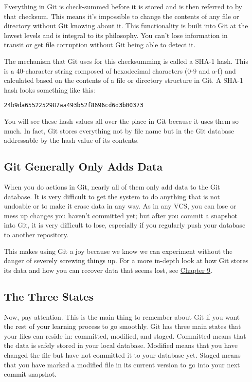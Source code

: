 \documentclass[a4paper]{book}
\newcounter{tab}[chapter]
\newcommand{\prechap}{Chapter }
\newcommand{\postchap}{}
\newcommand{\chapref}[1]{\hyperref[chap:#1]{\prechap #1\postchap}}
\begin{document}
Everything in Git is check-summed before it is stored and is then referred to by that checksum. This means it's impossible to change the contents of any file or directory without Git knowing about it. This functionality is built into Git at the lowest levels and is integral to its philosophy. You can't lose information in transit or get file corruption without Git being able to detect it.

The mechanism that Git uses for this checksumming is called a SHA-1 hash. This is a 40-character string composed of hexadecimal characters (0-9 and a-f) and calculated based on the contents of a file or directory structure in Git. A SHA-1 hash looks something like this:

\begin{shaded}\begin{verbatim}
24b9da6552252987aa493b52f8696cd6d3b00373
\end{verbatim}\end{shaded}

You will see these hash values all over the place in Git because it uses them so much. In fact, Git stores everything not by file name but in the Git database addressable by the hash value of its contents.

\subsection{Git Generally Only Adds Data}\label{git-generally-only-adds-data}

When you do actions in Git, nearly all of them only add data to the Git database. It is very difficult to get the system to do anything that is not undoable or to make it erase data in any way. As in any VCS, you can lose or mess up changes you haven't committed yet; but after you commit a snapshot into Git, it is very difficult to lose, especially if you regularly push your database to another repository.

This makes using Git a joy because we know we can experiment without the danger of severely screwing things up. For a more in-depth look at how Git stores its data and how you can recover data that seems lost, see \chapref{9}.

\subsection{The Three States}\label{the-three-states}

Now, pay attention. This is the main thing to remember about Git if you want the rest of your learning process to go smoothly. Git has three main states that your files can reside in: committed, modified, and staged. Committed means that the data is safely stored in your local database. Modified means that you have changed the file but have not committed it to your database yet. Staged means that you have marked a modified file in its current version to go into your next commit snapshot.
\end{document}
